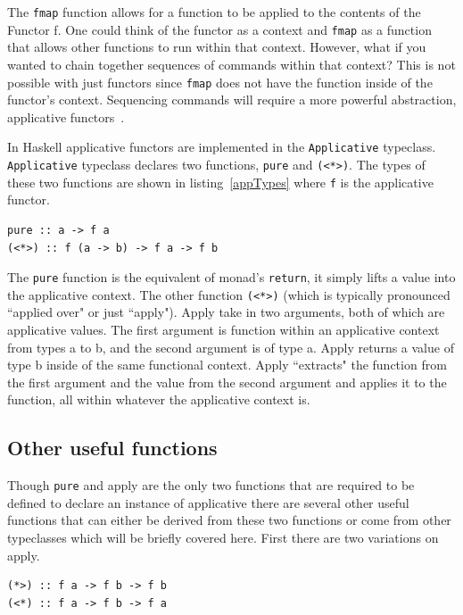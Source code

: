 The \texttt{fmap} function allows for a function to be applied to the contents of the Functor f. One could think of the functor as a context and \texttt{fmap} as a function that allows other functions to run within that context. However, what if you wanted to chain together sequences of commands within that context? This is not possible with just functors since \texttt{fmap} does not have the function inside of the functor's context. Sequencing commands will require a more powerful abstraction, applicative functors~\citep{realWorldHaskell}. 

In Haskell applicative functors are implemented in the \texttt{Applicative} typeclass. \texttt{Applicative} typeclass declares two functions, \texttt{pure} and \texttt{(<*>)}. The types of these two functions are shown in listing~\ref{appTypes} where \texttt{f} is the applicative functor. 

\begin{lstlisting}[frame=tblr,label=appTypes,caption={Types of Applicative's minimal complete definition}]
pure :: a -> f a
(<*>) :: f (a -> b) -> f a -> f b
\end{lstlisting}

The \texttt{pure} function is the equivalent of monad's \texttt{return}, it simply lifts a value into the applicative context. The other function \texttt{(<*>)} (which is typically pronounced ``applied over" or just ``apply"). Apply take in two arguments, both of which are applicative values. The first argument is function within an applicative context from types a to b, and the second argument is of type a. Apply returns a value of type b inside of the same functional context. Apply ``extracts" the function from the first argument and the value from the second argument and applies it to the function, all within whatever the applicative context is.

\subsection{Other useful functions}

Though \texttt{pure} and apply are the only two functions that are required to be defined to declare an instance of applicative there are several other useful functions that can either be derived from these two functions or come from other typeclasses which will be briefly covered here. First there are two variations on apply.

\begin{lstlisting}[frame=tblr]
(*>) :: f a -> f b -> f b
(<*) :: f a -> f b -> f a
\end{lstlisting}


